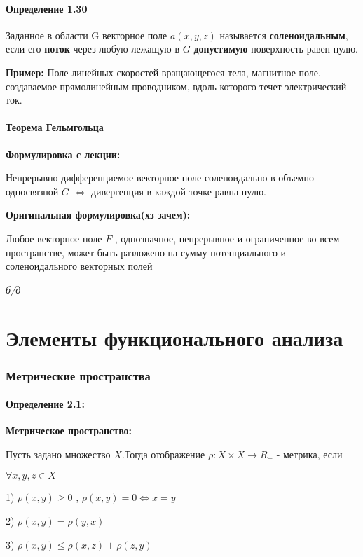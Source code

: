 \documentclass[12pt]{article}
\begin{document}
\subsection{Определение 1.30}
Заданное в области G векторное поле $a(x, y, z)$ называется \textbf{соленоидальным}, если его \textbf{поток} через любую лежащую в $G$ \textbf{допустимую} поверхность равен нулю.	

\textbf{Пример:} Поле линейных скоростей вращающегося тела, магнитное поле, создаваемое прямолинейным проводником, вдоль которого течет электрический ток.

\subsection{Теорема	 Гельмгольца}
	\par \textbf{Формулировка с лекции:}
	
		Непрерывно дифференциемое векторное поле соленоидально в объемно-односвязной $G$ $\Leftrightarrow$ дивергенция в каждой точке 		равна нулю.
	
	\par \textbf{Оригинальная формулировка(хз зачем):}
	
		Любое векторное поле $F$ , однозначное, непрерывное и ограниченное во всем пространстве, может быть разложено на сумму потенциального и соленоидального векторных полей	
	
	\textit{б/д}
	
\newpage	
\part{Элементы функционального анализа}
\section{Метрические пространства}
\subsection*{Определение 2.1:}
	\textbf{Метрическое пространство:}
	
	Пусть задано множество $X$.Тогда отображение $\rho: X \times X \to R_+$ - метрика, если 
	
	$\forall x,y,z \in X$
	
	1) $\rho(x,y) \ge 0$ , $\rho(x,y) = 0 \Leftrightarrow x = y$
	
	2) $\rho(x,y) = \rho(y,x)$
	
	3) $\rho(x,y) \leq \rho(x,z) + \rho(z,y) $
	
\end{document}
